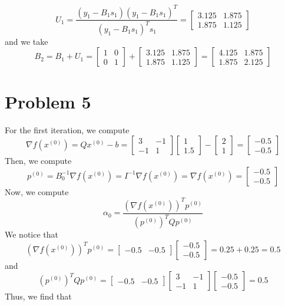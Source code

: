 \documentclass[12pt]{article}
\begin{document}
\[
U_1 = \frac{(y_1 - B_1 s_1)(y_1 - B_1 s_1)^T}{(y_1 - B_1 s_1)^T s_1} = 
\begin{bmatrix}
3.125 & 1.875\\
1.875 & 1.125
\end{bmatrix}
\] and we take
\[
B_2 = B_1 + U_1 =\begin{bmatrix}
1 & 0\\
0 & 1
\end{bmatrix}+  \begin{bmatrix}
3.125 & 1.875\\
1.875 & 1.125
\end{bmatrix} =
 \begin{bmatrix}
4.125 & 1.875\\
1.875 & 2.125
\end{bmatrix}
\]
\newpage
\section*{Problem 5}
For the first iteration, we compute
\[
\nabla f(x^{(0)}) = Qx^{(0)} - b = 
\begin{bmatrix}
3 & -1\\
-1 & 1
\end{bmatrix}
\begin{bmatrix}
1\\
1.5
\end{bmatrix} - 
\begin{bmatrix}
2\\
1
\end{bmatrix} = 
\begin{bmatrix}
-0.5\\
-0.5
\end{bmatrix}
\] Then, we compute
\[
p^{(0)} = B_0^{-1} \nabla f(x^{(0)}) = I^{-1} \nabla f(x^{(0)}) = \nabla f(x^{(0)}) = 
\begin{bmatrix}
-0.5\\
-0.5
\end{bmatrix}
\] Now, we compute
\[
\alpha_0 = \frac{(\nabla f(x^{(0)}))^T p^{(0)}}{(p^{(0)})^T Q p^{(0)}}
\] We notice that
\[
(\nabla f(x^{(0)}))^T p^{(0)} = 
\begin{bmatrix}
-0.5 & -0.5
\end{bmatrix}
\begin{bmatrix}
-0.5\\
-0.5
\end{bmatrix}
= 0.25 + 0.25 = 0.5
\] and
\[
(p^{(0)})^T Q p^{(0)} = 
\begin{bmatrix}
-0.5 &
-0.5
\end{bmatrix} \begin{bmatrix}
3 & -1\\
-1 & 1
\end{bmatrix} \begin{bmatrix}
-0.5\\
-0.5
\end{bmatrix} = 0.5
\] Thus, we find that
\end{document}
